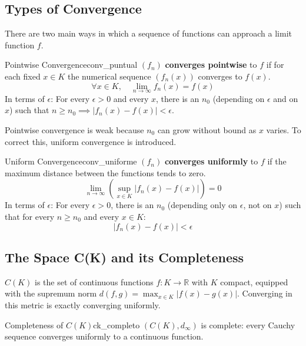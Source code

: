 \documentclass[11pt, a4paper]{article}
\begin{document}
\subsection{Types of Convergence}

There are two main ways in which a sequence of functions can approach a limit function
$f$.

\begin{definicion}{Pointwise Convergence}{conv_puntual}
$(f_n)$ \textbf{converges pointwise} to $f$ if for each fixed $x \in K$ the numerical sequence
$(f_n(x))$ converges to $f(x)$.
$$ \forall x \in K, \quad \lim_{n \to \infty} f_n(x) = f(x) $$
In terms of $\epsilon$: For every $\epsilon > 0$ and every $x$, there is an $n_0$ (depending on
$\epsilon$ and on $x$) such that $n \ge n_0 \implies |f_n(x) - f(x)| < \epsilon$.
\end{definicion}

Pointwise convergence is weak because $n_0$ can grow without bound as $x$ varies. To correct
this, uniform convergence is introduced.

\begin{definicion}{Uniform Convergence}{conv_uniforme}
$(f_n)$ \textbf{converges uniformly} to $f$ if the maximum distance between the functions tends
to zero.
$$ \lim_{n \to \infty} \left( \sup_{x \in K} |f_n(x) - f(x)| \right) = 0 $$
In terms of $\epsilon$: For every $\epsilon > 0$, there is an $n_0$ (depending only on
$\epsilon$, not on $x$) such that for every $n \ge n_0$ and every $x \in K$:
$$ |f_n(x) - f(x)| < \epsilon $$
\end{definicion}

\subsection{The Space C(K) and its Completeness}

$C(K)$ is the set of continuous functions $f: K \to \mathbb{R}$ with $K$ compact, equipped
with the supremum norm $d(f, g) = \max_{x \in K} |f(x) - g(x)|$. Converging in this metric is
exactly converging uniformly.

\begin{teorema}{Completeness of $C(K)$}{ck_completo}
$(C(K), d_\infty)$ is complete: every Cauchy sequence converges uniformly to a continuous
function.
\end{teorema}
\end{document}
